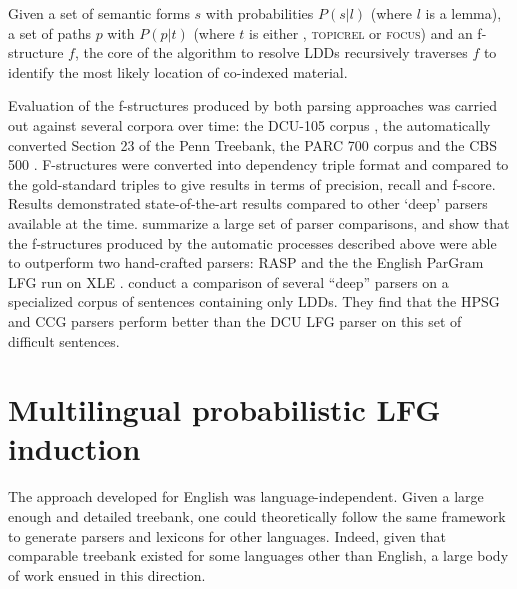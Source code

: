 \documentclass[output=paper,hidelinks]{langscibook}
\begin{document}
Given a set of semantic forms $s$ with probabilities ${P}(s | l)$ (where $l$ is a lemma), a set of paths $p$ with ${P}(p | t)$ (where $t$ is either \TOPIC, \textsc{topicrel} or \textsc{focus}) and an f-structure $f$, the core of the algorithm to
resolve LDDs recursively traverses $f$ to identify the most likely location of co-indexed material.  

Evaluation of the f-structures produced by both parsing approaches was carried out against several corpora over time: the DCU-105 corpus \citep{Cahill02automatic}, the automatically converted Section 23 of the Penn Treebank, the PARC 700 corpus \citep{Parc700} and the CBS 500 \citep{carrolletal:98}. F-structures were converted into dependency triple format and compared to the gold-standard triples to give results in terms of precision, recall and f-score. Results demonstrated state-of-the-art results compared to other `deep' parsers available at the time. \citet{cahill-etal-2008-wide} summarize a large set of parser comparisons, and show that the f-structures produced by the automatic processes described above were able to outperform two hand-crafted parsers: RASP \citep{carroll-briscoe-2002-high2} and the the English ParGram LFG run on XLE \citep{Riezler2002King}. \citet{rimell2009unbounded} conduct a comparison of several ``deep'' parsers on a specialized corpus of sentences containing only LDDs. They find that the HPSG and CCG parsers perform better than the DCU LFG parser on this set of difficult sentences. 





\section{Multilingual probabilistic LFG induction}
\label{sec:GrammarInduction:6}
The approach developed for English was language-independent. Given a large enough and detailed treebank, one could theoretically follow the same framework to generate parsers and lexicons for other languages. Indeed, given that comparable treebank existed for some languages other than English, a large body of work ensued in this direction. 
\end{document}
